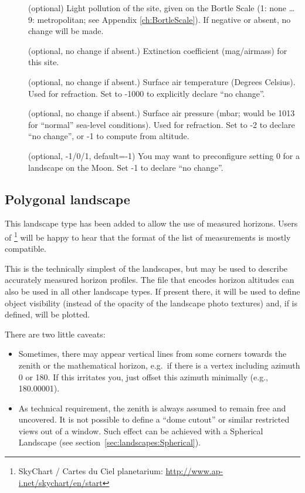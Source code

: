 \begin{description}
\item[] (optional) Light pollution of the site,
  given on the Bortle Scale (1: none \ldots 9: metropolitan; see
  Appendix \ref{ch:BortleScale}). If negative or absent, no change
  will be made.
\item[] (optional, no change
  if absent.) Extinction coefficient (mag/airmass) for this site.
\item[] (optional, no change if absent.)
  Surface air temperature (Degrees Celsius). Used for refraction. Set
  to -1000 to explicitly declare ``no change''.
\item[] (optional, no change if absent.)
  Surface air pressure (mbar; would be 1013 for ``normal'' sea-level
  conditions). Used for refraction. Set to -2 to declare ``no change'',
  or -1 to compute from altitude.
\item[] (optional, -1/0/1, default=-1) You may want
  to preconfigure setting 0 for a landscape on the Moon. Set -1 to
  declare ``no change''.
\end{description}


\subsection{Polygonal landscape}
\label{sec:landscapes:Polygonal}

This landscape type has been added  to allow
the use of measured horizons. Users of \footnote{SkyChart / Cartes du Ciel planetarium:
  \url{http://www.ap-i.net/skychart/en/start}} will be happy to hear
that the format of the list of measurements is mostly compatible.

This is the technically simplest of the landscapes, but may be used to
describe accurately measured horizon profiles. The file that encodes
horizon altitudes can also be used in all other landscape types. If
present there, it will be used to define object visibility (instead of
the opacity of the landscape photo textures) and, if
 is defined, will be plotted.

There are two little caveats:
\begin{itemize}
\item Sometimes, there may appear vertical lines
from some corners towards the zenith or the mathematical horizon,
e.g.\ if there is a vertex including azimuth 0 or 180. If this
irritates you, just offset this azimuth minimally (e.g., 180.00001).
\item As technical requirement, the zenith is always assumed to remain
  free and uncovered. It is not possible to define a ``dome cutout''
  or similar restricted views out of a window. Such effect can be
  achieved with a Spherical Landscape (see
  section~\ref{sec:landscapes:Spherical}).
\end{itemize}

